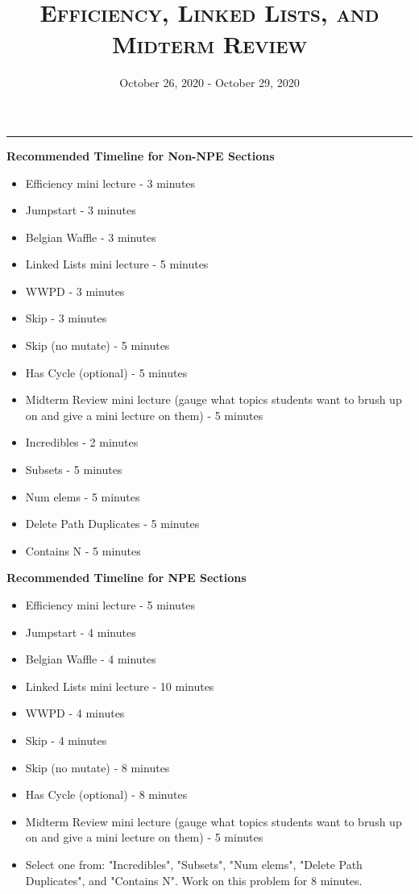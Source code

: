 \documentclass{exam}
\title{\textsc{Efficiency, Linked Lists, and Midterm Review}}
\date{October 26, 2020 - October 29, 2020}
\begin{document}
\maketitle
\rule{\textwidth}{0.15em}
\fontsize{12}{15}\selectfont

\begin{guide}
\textbf{Recommended Timeline for Non-NPE Sections}
\begin{itemize}
    \item Efficiency mini lecture - 3 minutes
    \item Jumpstart - 3 minutes
    \item Belgian Waffle - 3 minutes
    \item Linked Lists mini lecture - 5 minutes
    \item WWPD - 3 minutes
    \item Skip - 3 minutes
    \item Skip (no mutate) - 5 minutes
    \item Has Cycle (optional) - 5 minutes
    \item Midterm Review mini lecture (gauge what topics students want to brush up on and give a mini lecture on them) - 5 minutes
    \item Incredibles - 2 minutes
    \item Subsets - 5 minutes
    \item Num elems - 5 minutes
    \item Delete Path Duplicates - 5 minutes
    \item Contains N - 5 minutes
\end{itemize}
\vspace{.5cm}
\textbf{Recommended Timeline for NPE Sections}
\begin{itemize}
    \item Efficiency mini lecture - 5 minutes
    \item Jumpstart - 4 minutes
    \item Belgian Waffle - 4 minutes
    \item Linked Lists mini lecture - 10 minutes
    \item WWPD - 4 minutes
    \item Skip - 4 minutes
    \item Skip (no mutate) - 8 minutes
    \item Has Cycle (optional) - 8 minutes
    \item Midterm Review mini lecture (gauge what topics students want to brush up on and give a mini lecture on them) - 5 minutes
    \item Select one from: "Incredibles", "Subsets", "Num elems", "Delete Path Duplicates", and "Contains N". Work on this problem for 8 minutes.
\end{itemize}
\newpage
\end{guide}
\end{document}
